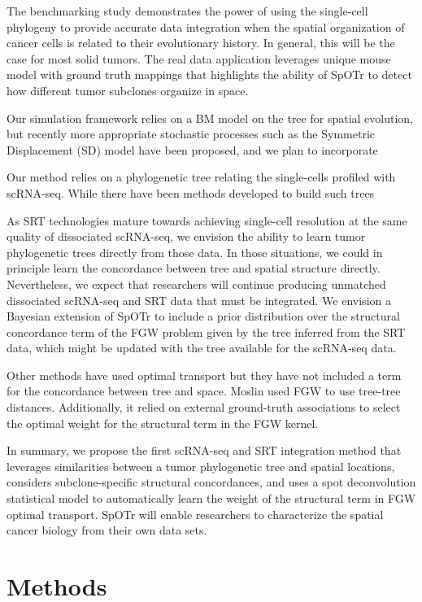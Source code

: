 \documentclass{article}
\newcommand{\toolnamex}{SpOTr }
\begin{document}
The benchmarking study demonstrates the power of using the single-cell phylogeny to provide accurate data integration when the spatial organization of cancer cells is related to their evolutionary history. In general, this will be the case for most solid tumors. The real data application leverages unique mouse model with ground truth mappings that highlights the ability of \toolnamex to detect how different tumor subclones organize in space.

Our simulation framework relies on a BM model on the tree for spatial evolution, but recently more appropriate stochastic processes such as the Symmetric Displacement (SD) model have been proposed, and we plan to incorporate 

Our method relies on a phylogenetic tree relating the single-cells profiled with scRNA-seq. While there have been methods developed to build such trees

As SRT technologies mature towards achieving single-cell resolution at the same quality of dissociated scRNA-seq, we envision the ability to learn tumor phylogenetic trees directly from those data. In those situations, we could in principle learn the concordance between tree and spatial structure directly. Nevertheless, we expect that researchers will continue producing unmatched dissociated scRNA-seq and SRT data that must be integrated. We envision a Bayesian extension of \toolnamex to include a prior distribution over the structural concordance term of the FGW problem given by the tree inferred from the SRT data, which might be updated with the tree available for the scRNA-seq data.

Other methods have used optimal transport but they have not included a term for the concordance between tree and space. Moslin used FGW to use tree-tree distances. Additionally, it relied on external ground-truth associations to select the optimal weight for the structural term in the FGW kernel. 

In summary, we propose the first scRNA-seq and SRT integration method that leverages similarities between a tumor phylogenetic tree and spatial locations, considers subclone-specific structural concordances, and uses a spot deconvolution statistical model to automatically learn the weight of the structural term in FGW optimal transport. \toolnamex will enable researchers to characterize the spatial cancer biology from their own data sets. 


\section*{Methods}
\label{sec:methods}
\end{document}
